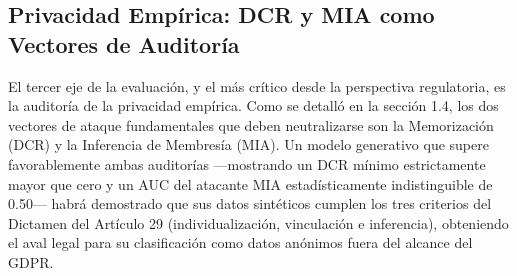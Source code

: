 \subsection{Privacidad Empírica: DCR y MIA como Vectores de Auditoría}

El tercer eje de la evaluación, y el más crítico desde la perspectiva regulatoria, es la auditoría de la privacidad empírica. Como se detalló en la sección 1.4, los dos vectores de ataque fundamentales que deben neutralizarse son la Memorización (DCR) y la Inferencia de Membresía (MIA). Un modelo generativo que supere favorablemente ambas auditorías —mostrando un DCR mínimo estrictamente mayor que cero y un AUC del atacante MIA estadísticamente indistinguible de 0.50— habrá demostrado que sus datos sintéticos cumplen los tres criterios del Dictamen del Artículo 29 (individualización, vinculación e inferencia), obteniendo el aval legal para su clasificación como datos anónimos fuera del alcance del GDPR.
